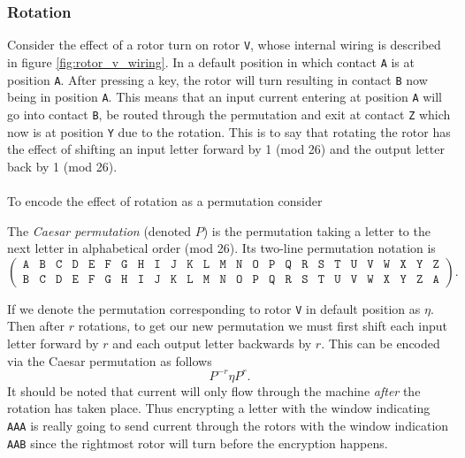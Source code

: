\subsubsection{Rotation}

Consider the effect of a rotor turn on rotor \texttt{V}, whose
internal wiring is described in figure \ref{fig:rotor_v_wiring}.
In a default position in which contact \texttt{A} is at position
\texttt{A}. After pressing a key, the rotor
will turn resulting in contact \texttt{B} now being in position
\texttt{A}. This means that an input current
entering at position \texttt{A} will go into contact \texttt{B}, be
routed through the permutation and exit at contact
\texttt{Z} which now is at position \texttt{Y} due to the rotation.
This is to say that rotating the rotor has the effect
of shifting an input letter forward by 1 (mod 26) and the output
letter back by 1 (mod 26).
\\\\To encode the effect of rotation as a permutation consider
\begin{definition}
  The \emph{Caesar permutation} (denoted $P$) is the permutation
  taking a letter to the next letter in alphabetical order (mod 26).
  Its two-line permutation notation is
  \[
    \left(
      \begin{array}{llllllllllllllllllllllllll}
        \texttt{A} & \texttt{B} & \texttt{C} & \texttt{D} &
        \texttt{E} & \texttt{F} & \texttt{G} & \texttt{H} &
        \texttt{I} & \texttt{J} & \texttt{K} & \texttt{L} &
        \texttt{M} & \texttt{N} & \texttt{O} & \texttt{P} &
        \texttt{Q} & \texttt{R} & \texttt{S} & \texttt{T} &
        \texttt{U} & \texttt{V} & \texttt{W} & \texttt{X} &
        \texttt{Y} & \texttt{Z}                             \\
        \texttt{B} & \texttt{C} & \texttt{D} &
        \texttt{E} & \texttt{F} & \texttt{G} & \texttt{H} &
        \texttt{I} & \texttt{J} & \texttt{K} & \texttt{L} &
        \texttt{M} & \texttt{N} & \texttt{O} & \texttt{P} &
        \texttt{Q} & \texttt{R} & \texttt{S} & \texttt{T} &
        \texttt{U} & \texttt{V} & \texttt{W} & \texttt{X} &
        \texttt{Y} & \texttt{Z} & \texttt{A}
      \end{array}
    \right).
  \]
\end{definition}
\noindent If we denote the permutation corresponding to rotor \texttt{V} in
default position as $\eta$. Then after $r$ rotations, to get
our new permutation we must first shift each input letter forward by
$r$ and each output letter backwards by $r$. This can be encoded via
the Caesar permutation as follows
\[
  {P^{-r}}\eta{P^{r}}.
\]
\noindent It should be noted that current will only flow through the
machine \emph{after} the rotation has taken place. Thus encrypting a
letter with the window indicating \texttt{AAA} is really going to
send current through the rotors with the window indication
\texttt{AAB} since the rightmost rotor will turn before the encryption happens.
